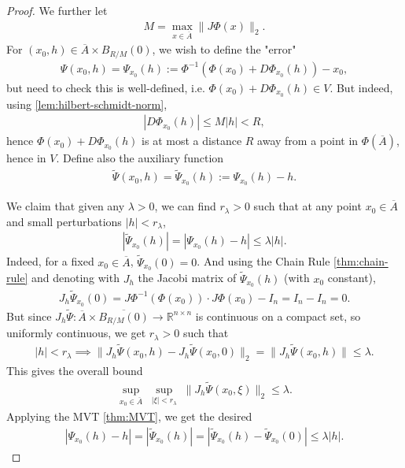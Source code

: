 \begin{proof}
	We further let
	\begin{align*}
		M = \max_{x \in \overline{ A } } \lVert J \Phi(x) \rVert_{2}.
	\end{align*}
	For $(x_{0}, h) \in \overline{ A }  \times B_{R / M}(0)$, we wish to define the "error"
	\begin{align*}
		\Psi(x_{0}, h) = \Psi_{x_{0}}(h) := \Phi^{-1}(\Phi(x_{0}) + D \Phi_{x_{0}}(h)) - x_{0},
	\end{align*}
	but need to check this is well-defined, i.e. $\Phi(x_{0}) + D \Phi_{x_{0}}(h) \in V$. But indeed, using \ref{lem:hilbert-schmidt-norm},
	\begin{align*}
		\left| D \Phi_{x_{0}}(h) \right| \leq M \left| h \right| < R,
	\end{align*}
	hence $\Phi(x_{0}) + D \Phi_{x_{0}}(h)$ is at most a distance $R$ away from a point in $\Phi(\overline{ A } )$, hence in $V$. Define also the auxiliary function
	\begin{align*}
		\widetilde{\Psi}(x_{0}, h) = \widetilde{\Psi}_{x_{0}}(h) := \Psi_{x_{0}}(h) - h.
	\end{align*}

	We claim that given any $\lambda > 0$, we can find $r_{\lambda} > 0$ such that at any point $x_{0} \in \overline{ A } $ and small perturbations $\left| h \right| < r_{\lambda}$,
	\begin{align*}
		\left| \widetilde{\Psi}_{x_{0}}(h) \right| = \left| \Psi_{x_{0}}(h) - h \right| \leq \lambda \left| h \right|.
	\end{align*}
	Indeed, for a fixed $x_{0} \in \overline{ A } $, $\widetilde{\Psi}_{x_{0}}(0) = 0$. And using the Chain Rule \ref{thm:chain-rule} and denoting with $J_{h}$ the Jacobi matrix of $\widetilde{\Psi}_{x_{0}}(h)$ (with $x_{0}$ constant),
	\begin{align*}
		J_{h} \widetilde{\Psi}_{x_{0}}(0) = J \Phi^{-1}( \Phi(x_{0})) \cdot J \Phi(x_{0}) - I_{n} = I_{n} - I_{n} = 0.
	\end{align*}
	But since $J_{h} \widetilde{\Psi}: \overline{ A }  \times \overline{ B_{R / M}(0) } \to \mathbb{R}^{n \times n}$ is continuous on a compact set, so uniformly continuous, we get $r_{\lambda} > 0$ such that
	\begin{align*}
		\left| h \right| < r_{\lambda} \implies \lVert J_{h} \widetilde{\Psi}(x_{0}, h) - J_{h} \widetilde{\Psi}(x_{0}, 0) \rVert_{2} = \lVert J_{h} \widetilde{\Psi}(x_{0}, h) \rVert \leq \lambda.
	\end{align*}
	This gives the overall bound
	\begin{align*}
		\sup_{x_{0} \in \overline{ A } } \; \sup_{\left| \xi \right| < r_{\lambda}} \; \lVert J_{h} \widetilde{\Psi}(x_{0}, \xi) \rVert_{2} \leq \lambda.
	\end{align*}
	Applying the MVT \ref{thm:MVT}, we get the desired
	\begin{align*}
		\left| \Psi_{x_{0}}(h) - h \right| = \left| \widetilde{\Psi}_{x_{0}}(h) \right| = \left| \widetilde{\Psi}_{x_{0}}(h) - \widetilde{\Psi}_{x_{0}}(0) \right| \leq \lambda \left| h \right|.
	\end{align*}


\end{proof}
